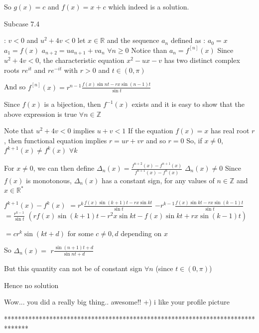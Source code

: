 \begin{solution}
So $g(x)=c$ and $f(x)=x+c$ which indeed is a solution.

\begin{bolded}Subcase 7.4 \end{bolded}: $v<0$ and $u^2+4v<0$
let $x\in\mathbb R$ and the sequence $a_n$ defined as :
$a_0=x$
$a_1=f(x)$
$a_{n+2}=ua_{n+1}+va_n$ $\forall n\ge 0$
Notice than $a_n=f^{[n]}(x)$
Since $u^2+4v<0$, the characteristic equation $x^2-ux-v$ has two distinct complex roots $re^{it}$ and $re^{-it}$ with $r>0$ and $t\in(0,\pi)$

And so $f^{[n]}(x)=r^{n-1}\frac{f(x)\sin nt-rx\sin(n-1)t}{\sin t}$

Since $f(x)$ is a bijection, then $f^{-1}(x)$ exists and it is easy to show that the above expression is true $\forall n\in\mathbb Z$

Note that $u^2+4v<0$ implies $u+v<1$
If the equation $f(x)=x$ has real root $r$, then functional equation implies $r=ur+vr$ and so $r=0$
So, if $x\ne 0$, $f^{k+1}(x)\ne f^k(x)$ $\forall k$

For $x\ne 0$, we can then define $\Delta_n(x)=\frac{f^{n+2}(x)-f^{n+1}(x)}{f^{n+1}(x)-f^{n}(x)}$
$\Delta_n(x)\ne 0$
Since $f(x)$ is monotonous, $\Delta_n(x)$ has a constant sign, for any values of $n\in\mathbb Z$ and $x\in\mathbb R^*$

$f^{k+1}(x)-f^{k}(x)$ $=r^{k}\frac{f(x)\sin (k+1)t-rx\sin kt}{\sin t}$ $-r^{k-1}\frac{f(x)\sin kt-rx\sin(k-1)t}{\sin t}$
$=\frac{r^{k-1}}{\sin t}$ $(rf(x)\sin (k+1)t-r^2x\sin kt-f(x)\sin kt+rx\sin(k-1)t)$

$=cr^k\sin(kt+d)$ for some $c\ne 0,d$ depending on $x$

So $\Delta_n(x)=$ $r\frac{\sin (n+1)t+d}{\sin nt+d}$

But this quantity can not be of constant sign $\forall n$ (since $t\in(0,\pi)$)

Hence no solution


\end{solution}



\begin{solution}
	Wow... you did a really big thing..   awesome!!
+) i like your profile picture
\end{solution}
*******************************************************************************
